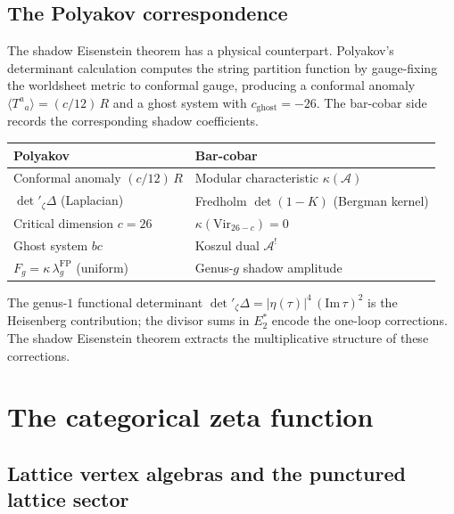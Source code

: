\documentclass[11pt,reqno]{amsart}
\theoremstyle{definition}
\theoremstyle{remark}
\providecommand{\cA}{\mathcal{A}}
\providecommand{\Vir}{\mathrm{Vir}}
\providecommand{\FP}{\mathrm{FP}}
\numberwithin{equation}{section}
\begin{document}
\subsection{The Polyakov correspondence}

The shadow Eisenstein theorem has a physical counterpart.
Polyakov's determinant calculation computes the string partition function by
gauge-fixing the worldsheet metric to conformal gauge, producing a
conformal anomaly $\langle T^a{}_a \rangle = (c/12)\,R$ and a ghost
system with $c_{\mathrm{ghost}} = -26$. The bar-cobar side records
the corresponding shadow coefficients.

\begin{center}
\renewcommand{\arraystretch}{1.15}
\begin{tabular}{@{} l l @{}}
\toprule
\textbf{Polyakov} & \textbf{Bar-cobar} \\ \midrule
Conformal anomaly $(c/12)\,R$
  & Modular characteristic $\kappa(\cA)$ \\
$\det'_\zeta \Delta$ (Laplacian)
  & Fredholm $\det(1 - K)$ (Bergman kernel) \\
Critical dimension $c = 26$
  & $\kappa(\Vir_{26-c}) = 0$ \\
Ghost system $bc$
  & Koszul dual $\cA^!$ \\
$F_g = \kappa\,\lambda_g^{\FP}$ (uniform)
  & Genus-$g$ shadow amplitude \\
\bottomrule
\end{tabular}
\end{center}

The genus-$1$ functional determinant
$\det'_\zeta \Delta = |\eta(\tau)|^4\,(\mathrm{Im}\,\tau)^2$ is the
Heisenberg contribution; the divisor sums in $E_2^*$ encode the
one-loop corrections. The shadow Eisenstein theorem extracts the
multiplicative structure of these corrections.


\section{The categorical zeta function}\label{sec:categorical-zeta}

\subsection{Lattice vertex algebras and the punctured lattice sector}
\end{document}
